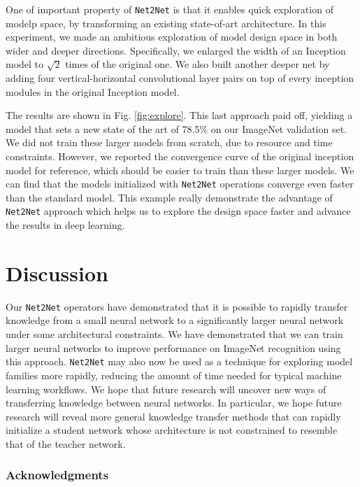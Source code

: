 \documentclass{article} %
\begin{document}
One of important property of {\tt Net2Net} is that it enables quick exploration
of modelp space, by transforming an existing state-of-art architecture.
In this experiment, we made an ambitious exploration of model design space in both wider and deeper directions.
Specifically, we enlarged the width of an Inception model to $\sqrt{2}$ times of the original one.
We also built another deeper net by adding four vertical-horizontal convolutional layer pairs on top of every inception modules in the original Inception model.

The results are shown in Fig. \ref{fig:explore}. This last approach paid off, yielding a model that sets a new state of the
art of 78.5\% on our ImageNet validation set.
We did not train these larger models from scratch, due to resource and time constraints.
However,  we reported the convergence curve of  the original inception model for reference, which should be easier to train than these larger models.
We can find that the models initialized with {\tt Net2Net} operations converge even faster than the standard model.
This example really demonstrate the advantage of {\tt Net2Net} approach which helps us to explore the design space faster and advance the results in deep learning.

\section{Discussion}

Our {\tt Net2Net} operators have demonstrated that it is possible
to rapidly transfer knowledge from a small neural network to a
significantly larger neural network under some architectural
constraints.
We have demonstrated that we can train larger neural networks
to improve performance on ImageNet recognition using this
approach.
{\tt Net2Net} may also now be used as a technique for exploring
model families more rapidly, reducing the amount of time needed
for typical machine learning workflows.
We hope that future research will uncover new ways of transferring
knowledge between neural networks.
In particular, we hope future research will reveal more general
knowledge transfer methods that can rapidly initialize a student
network whose architecture is not constrained to resemble that
of the teacher network.


\subsubsection*{Acknowledgments}
\end{document}
